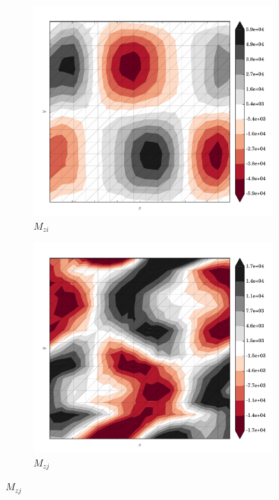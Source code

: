 \begin{figure}
  \begin{subfigure}[b]{0.3\linewidth}
    \includegraphics[width=\linewidth]{images/stress_balance/FS/M_zi.pdf}
  \caption{$M_{zi}$}
  \label{fs_M_zi}
  \end{subfigure}
  \begin{subfigure}[b]{0.3\linewidth}
    \includegraphics[width=\linewidth]{images/stress_balance/FS/M_zj.pdf}
  \caption{$M_{zj}$}
  \label{fs_M_zj}
  \end{subfigure}

\end{figure}
